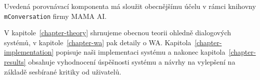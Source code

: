 Uvedená porovnávací komponenta má sloužit obecnějšímu účelu v rámci
kni\-ho\-vny \texttt{mConversation} firmy MAMA AI.

V kapitole~\ref{chapter-theory} shrnujeme obecnou teorii ohledně dialogových
systémů, v kapitole~\ref{chapter-wa} pak detaily o WA. Kapitola~\ref{chapter-implementation}
popisuje naši implementaci systému a nakonec kapitola~\ref{chapter-results}
obsahuje vyhodnocení úspěšnosti systému a návrhy na vylepšení
na základě sesbírané kritiky od uživatelů.